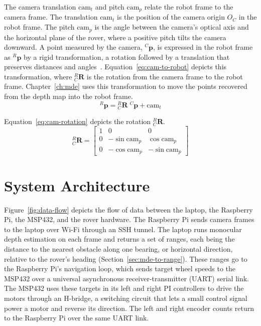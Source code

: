 The camera translation $\mathrm{cam}_t$ and pitch $\mathrm{cam}_p$ relate the robot frame
to the camera frame. The translation $\mathrm{cam}_t$ is the position of the camera origin
$O_C$ in the robot frame. The pitch $\mathrm{cam}_p$ is the angle between the camera's
optical axis and the horizontal plane of the rover, where a positive pitch tilts the camera
downward. A point measured by the camera, ${}^{C}\mathbf{p}$, is expressed in the robot frame
as ${}^{R}\mathbf{p}$ by a rigid transformation, a rotation followed by a translation that
preserves distances and angles~\cite{Forsyth_Ponce_CV}.
Equation~\ref{eq:cam-to-robot} depicts this transformation, where ${}^{R}_{C}\mathbf{R}$ is
the rotation from the camera frame to the robot frame. Chapter~\ref{ch:mde} uses this
transformation to move the points recovered from the depth map into the robot frame.
\begin{equation}
  {}^{R}\mathbf{p} = {}^{R}_{C}\mathbf{R}\;{}^{C}\mathbf{p} + \mathrm{cam}_t
  \label{eq:cam-to-robot}
\end{equation}

Equation~\ref{eq:cam-rotation} depicts the rotation ${}^{R}_{C}\mathbf{R}$.
\begin{equation}
  {}^{R}_{C}\mathbf{R} =
  \begin{bmatrix}
    1 & 0 & 0 \\
    0 & -\sin\mathrm{cam}_p & \cos\mathrm{cam}_p \\
    0 & -\cos\mathrm{cam}_p & -\sin\mathrm{cam}_p
  \end{bmatrix}
  \label{eq:cam-rotation}
\end{equation}


\section{System Architecture}
\label{sec:system-architecture}




Figure~\ref{fig:data-flow} depicts the flow of data between the laptop, the Raspberry Pi,
the MSP432, and the rover hardware. The Raspberry Pi sends camera frames to the laptop over
Wi-Fi through an SSH tunnel. The laptop runs monocular depth estimation on each frame and returns a set of
ranges, each being the distance to the nearest obstacle along one bearing, or horizontal
direction, relative to the rover's heading (Section~\ref{sec:mde-to-range}). These ranges
go to the Raspberry Pi's navigation loop, which sends target wheel speeds to the MSP432
over a universal asynchronous receiver-transmitter (UART) serial link. The MSP432 uses
these targets in its left and right PI controllers to drive the motors through an
H-bridge, a switching circuit that lets a small control signal power a motor and reverse
its direction. The left and right encoder counts return to the Raspberry Pi over the same
UART link.


